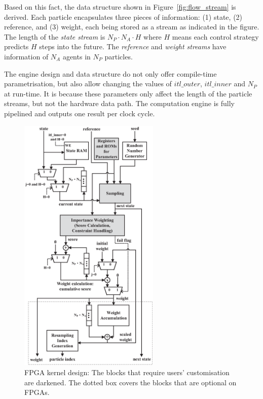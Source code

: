 Based on this fact, the data structure shown in Figure~\ref{fig:flow_stream} is derived.
Each particle encapsulates three pieces of information: (1) state, (2) reference, and (3) weight, each being stored as a stream as indicated in the figure.
The length of the \textit{state stream} is $N_P \cdot N_A \cdot H$ where $H$ means each control strategy predicts $H$ steps into the future.
The \textit{reference} and \textit{weight streams} have information of $N_A$ agents in $N_P$ particles.

The engine design and data structure do not only offer compile-time parametrisation, but also allow changing the values of $itl\_outer$, $itl\_inner$ and $N_P$ at run-time.
It is because these parameters only affect the length of the particle streams, but not the hardware data path.
The computation engine is fully pipelined and outputs one result per clock cycle.

\begin{figure}[t!]
\begin{center}
\includegraphics[width=0.6\textwidth]{5_tool/figures/kernel}
\end{center}
\caption{FPGA kernel design: The blocks that require users' customisation are darkened. The dotted box covers the blocks that are optional on FPGAs.}
\label{fig:flow_kernel}
\end{figure}

